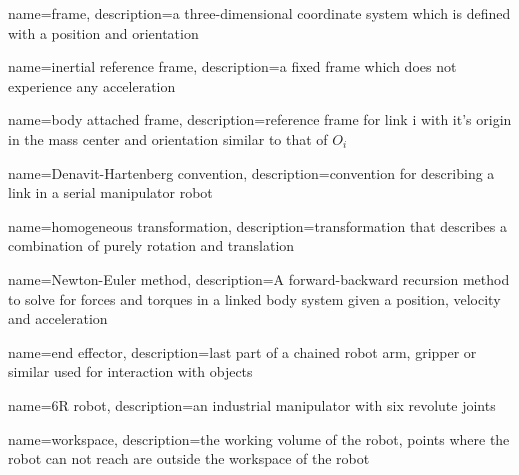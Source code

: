\makeglossaries

{
    name={frame},
    description={a three-dimensional coordinate system which is defined with a position and orientation}
}

{
    name={inertial reference frame},
    description={a fixed frame which does not experience any acceleration}
}
 
 
{
    name={body attached frame},
    description={reference frame for link i with it's origin in the mass center and orientation similar to that of $O_i$}
}

{
    name={Denavit-Hartenberg convention},
    description={convention for describing a link in a serial manipulator robot}
}

{
    name={homogeneous transformation},
    description={transformation that describes a combination of purely rotation and translation}
}


{
    name={Newton-Euler method},
    description={A forward-backward recursion method to solve for forces and torques in a linked body system given a position, velocity and acceleration}
}

{
    name={end effector},
    description={last part of a chained robot arm, gripper or similar used for interaction with objects}
}

{
    name={6R robot},
    description={an industrial manipulator with six revolute joints}
}

{
    name={workspace},
    description={the working volume of the robot, points where the robot can not reach are outside the workspace of the robot}
}


